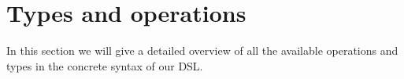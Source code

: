 \section{Types and operations}
\label{sec:operations}

In this section we will give a detailed overview of all the available
operations and types in the concrete syntax of our DSL.

% 
% 
% 
% 
% 


